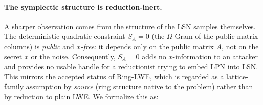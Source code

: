 \documentclass[11pt,a4paper]{article}
\theoremstyle{plain}
\theoremstyle{definition}
\begin{document}
\paragraph{The symplectic structure is reduction-inert.}
A sharper observation comes from the structure of the LSN samples themselves. The deterministic quadratic constraint $S_A = 0$ (the $\Omega$-Gram of the public matrix columns) is \emph{public} and \emph{$x$-free}: it depends only on the public matrix $A$, not on the secret $x$ or the noise. Consequently, $S_A=0$ adds no $x$-information to an attacker and provides no usable handle for a reductionist trying to embed LPN into LSN. This mirrors the accepted status of Ring-LWE, which is regarded as a lattice-family assumption by \emph{source} (ring structure native to the problem) rather than by reduction to plain LWE. We formalize this as:
\end{document}
